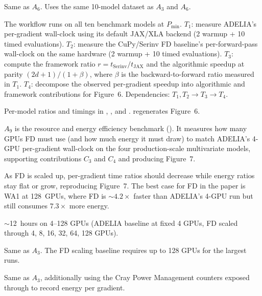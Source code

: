 \documentclass[nonacm,sigconf]{acmart}
\begin{document}
Same as $A_6$. Uses the same 10-model dataset as $A_3$ and $A_6$.

\artcomp

The workflow runs on all ten benchmark models at $P_{\min}$.
$T_1$: measure ADELIA's per-gradient wall-clock using its
default JAX/XLA backend (2 warmup + 10 timed evaluations).
$T_2$: measure the CuPy/Serinv FD baseline's per-forward-pass
wall-clock on the same hardware (2 warmup + 10 timed
evaluations).
$T_3$: compute the framework ratio
$r = t_{\mathrm{Serinv}}/t_{\mathrm{JAX}}$ and the
algorithmic speedup at parity $(2d{+}1)/(1+\beta)$,
where $\beta$ is the backward-to-forward ratio measured in
$T_1$.
$T_4$: decompose the observed per-gradient speedup into
algorithmic and framework contributions for Figure~6.
Dependencies: $T_1, T_2 \rightarrow T_3 \rightarrow T_4$.

\artout

Per-model ratios and timings in
,
, and
.
 regenerates Figure~6.


\newartifact

\artrel

$A_9$ is the resource and energy efficiency benchmark
(). It measures
how many GPUs FD must use (and how much energy it must draw) to
match ADELIA's 4-GPU per-gradient wall-clock on the four
production-scale multivariate models, supporting contributions
$C_3$ and $C_4$ and producing Figure~7.

\artexp

As FD is scaled up, per-gradient time ratios should decrease
while energy ratios stay flat or grow, reproducing
Figure~7. The best case for FD in the paper is WA1 at
128~GPUs, where FD is $\sim 4.2\times$ faster than ADELIA's
4-GPU run but still consumes $7.3\times$ more energy.

\arttime

$\sim$12~hours on 4--128 GPUs (ADELIA baseline at fixed 4 GPUs,
FD scaled through 4, 8, 16, 32, 64, 128 GPUs).

\artin


Same as $A_3$. The FD scaling baseline requires up to 128 GPUs
for the largest runs.


Same as $A_3$, additionally using the Cray Power Management
counters exposed through
 to record energy
per gradient.
\end{document}
